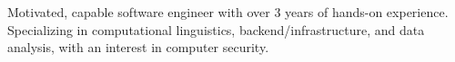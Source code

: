 

\begin{cvparagraph}

Motivated, capable software engineer with over 3 years of hands-on experience. Specializing in computational linguistics, backend/infrastructure, and data analysis, with an interest in computer security. 
\end{cvparagraph}
